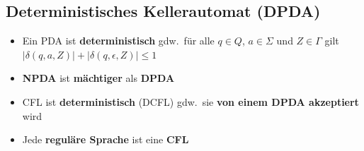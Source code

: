 \documentclass[ieeetran]{article}
\begin{document}
\subsection{Deterministisches Kellerautomat (DPDA)} %
\label{sub:deterministisches_kellerautomat_dPDA_}
\begin{itemize}
  \item Ein PDA ist \textbf{deterministisch} gdw.\ für alle $q \in Q$, $a \in \Sigma$ und $Z \in \Gamma$ gilt $|\delta(q,a,Z)| + |\delta(q, \epsilon, Z)| \le 1$
\item \textbf{NPDA} ist \textbf{mächtiger} als \textbf{DPDA}
\item CFL ist \textbf{deterministisch} (DCFL) gdw.\ sie \textbf{von einem DPDA akzeptiert} wird
\item Jede \textbf{reguläre Sprache} ist eine \textbf{CFL}
\end{itemize}
\end{document}

